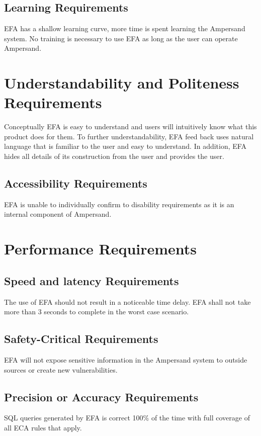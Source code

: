 \subsection{Learning Requirements}\label{subsec:LearningReq}
EFA has a shallow learning curve, more time is spent learning the Ampersand 
system. No training is necessary to use EFA as long as the user can operate 
Ampersand.

\section{Understandability and Politeness 
Requirements}\label{sec:Understandability}
Conceptually EFA is easy to understand and users will intuitively know what 
this product does for them. To further understandability, EFA feed back uses 
natural language that is familiar to the user and easy to understand. In 
addition, EFA hides all details of its construction from the user and provides 
the user. 

\subsection{Accessibility Requirements}\label{Accessibility}
EFA is unable to individually confirm to disability requirements as it is an 
internal component of Ampersand.

\section{Performance Requirements}\label{sec:Performance}
\subsection{Speed and latency Requirements}\label{subsec:SpeedReq}
The use of EFA should not result in a noticeable time delay. EFA shall 
not take more than 3 seconds to complete in the worst case scenario.

\subsection{Safety-Critical Requirements}\label{subec:SafetyReq}
EFA will not expose sensitive information in the Ampersand system to outside 
sources or create new vulnerabilities.

\subsection{Precision or Accuracy Requirements}\label{subsec:AccuracyReq}
SQL queries generated by EFA is correct 100\% of the time with full coverage of 
all ECA rules that apply.
 
